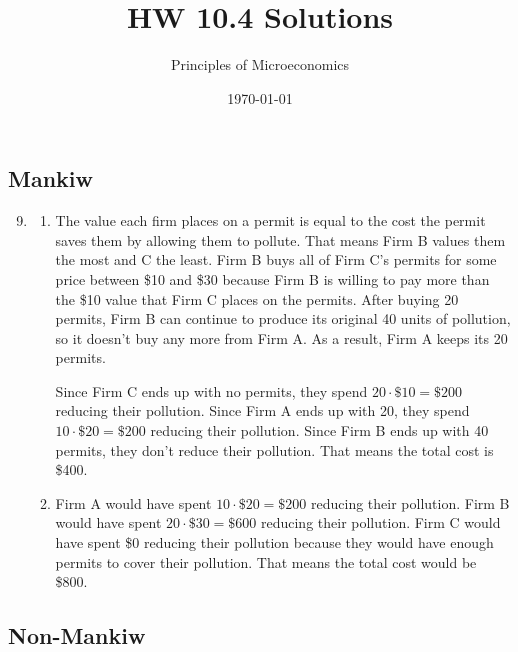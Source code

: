 \documentclass{article}
\title{HW 10.4 Solutions}
\author{Principles of Microeconomics}
\date{\today}
\begin{document}
\maketitle

\subsection*{Mankiw}

\begin{enumerate}
\setcounter{enumi}{8}

\item 	

	\begin{enumerate}
	
	\item The value each firm places on a permit is equal to the cost the permit saves them by allowing them to pollute. That means Firm B values them the most and C the least. Firm B buys all of Firm C's permits for some price between \$10 and \$30 because Firm B is willing to pay more than the \$10 value that Firm C places on the permits. After buying 20 permits, Firm B can continue to produce its original 40 units of pollution, so it doesn't buy any more from Firm A. As a result, Firm A keeps its 20 permits. 

Since Firm C ends up with no permits, they spend $20 \cdot \$10 = \$200$ reducing their pollution. Since Firm A ends up with 20, they spend $10 \cdot \$20 = \$200$ reducing their pollution. Since Firm B ends up with 40 permits, they don't reduce their pollution. That means the total cost is \$400.

	\item Firm A would have spent $10 \cdot \$20 = \$200$ reducing their pollution. Firm B would have spent $20 \cdot \$30 = \$600$ reducing their pollution. Firm C would have spent \$0 reducing their pollution because they would have enough permits to cover their pollution. That means the total cost would be \$800.

	\end{enumerate}

\end{enumerate}

\subsection*{Non-Mankiw}
\end{document}
